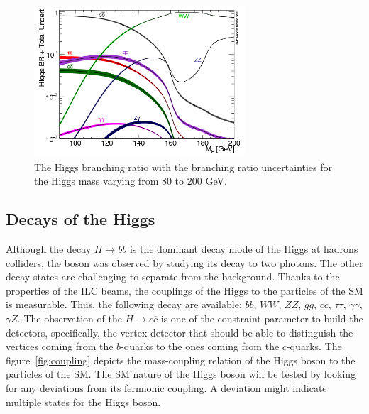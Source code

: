        
    \begin{figure}[!h]
      \centering
      \includegraphics[width = 0.7\textwidth]{Pictures/Higgs/BRTotalUncertBands_lm.png}
      \caption{The Higgs branching ratio with the branching ratio uncertainties for the Higgs mass varying from 80 to 200 GeV\cite{Denner:2011mq}.}
      \label{fig:higgsProd}
    \end{figure}

    \subsection{Decays of the Higgs}
    
    Although the decay $H \rightarrow b\overline{b}$ is the dominant decay mode of the Higgs at hadrons colliders, the boson was observed by studying its decay to two photons.
    The other decay states are challenging to separate from the background.
    Thanks to the properties of the \gls{ILC} beams, the couplings of the Higgs to the particles of the \gls{SM} is measurable.
    Thus, the following decay are available: $b\overline{b}$, $WW$, $ZZ$, $gg$, $c\overline{c}$, $\tau \tau$, $\gamma \gamma$, $\gamma Z$.
    The observation of the $H \rightarrow c\overline{c}$ is one of the constraint parameter to build the detectors, specifically, the vertex detector that should be able to distinguish the vertices coming from the $b$-quarks to the ones coming from the $c$-quarks.
    The figure~\ref{fig:coupling} depicts the mass-coupling relation of the Higgs boson to the particles of the \gls{SM}.
    The \gls{SM} nature of the Higgs boson will be tested by looking for any deviations from its fermionic coupling.
    A deviation might indicate multiple states for the Higgs boson. 

